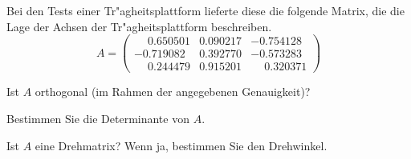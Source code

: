Bei den Tests einer Tr"agheitsplattform lieferte diese die folgende Matrix,
die die Lage der Achsen der Tr"agheitsplattform beschreiben.
\[
A=\begin{pmatrix}
\phantom{-}0.650501&0.090217&          -0.754128\\
  -0.719082&0.392770&          -0.573283\\
\phantom{-}0.244479&0.915201&\phantom{-}0.320371
\end{pmatrix}
\]
\begin{teilaufgaben}
\item Ist $A$ orthogonal (im Rahmen der angegebenen Genauigkeit)?
\item Bestimmen Sie die Determinante von $A$.
\item Ist $A$ eine Drehmatrix? Wenn ja, bestimmen Sie den Drehwinkel.
\end{teilaufgaben}

